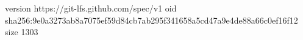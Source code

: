version https://git-lfs.github.com/spec/v1
oid sha256:9e0a3273ab8a7075ef59d84cb7ab295f341658a5cd47a9e4de88a66c0ef16f12
size 1303
